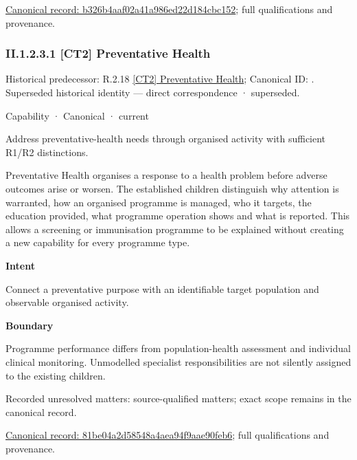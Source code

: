 {\footnotesize \href{../../../../continuum/strategy/capability/b326b4aaf02a41a986ed22d184cbc152.md}{Canonical record: b326b4aaf02a41a986ed22d184cbc152}; full qualifications and provenance.}\par
\subsubsection*{II.1.2.3.1 [CT2] Preventative Health}
\label{navigation:II.1.2.3.1}

{\small Historical predecessor: R.2.18 \hyperref[element:80affa7bcd284ecbbcbc5092f8497ddf]{[CT2] Preventative Health}; Canonical ID: \texttt{}. Superseded historical identity — direct correspondence · superseded.}\par
\label{element:81be04a2d58548a4aea94f9aae90feb6}
{\small Capability · Canonical · current}\par

Address preventative-health needs through organised activity with sufficient R1/R2 distinctions.



Preventative Health organises a response to a health problem before adverse outcomes arise or worsen. The established children distinguish why attention is warranted, how an organised programme is managed, who it targets, the education provided, what programme operation shows and what is reported. This allows a screening or immunisation programme to be explained without creating a new capability for every programme type.



\textbf{Intent}



Connect a preventative purpose with an identifiable target population and observable organised activity.



\textbf{Boundary}



Programme performance differs from population-health assessment and individual clinical monitoring. Unmodelled specialist responsibilities are not silently assigned to the existing children.


{\small Recorded unresolved matters: source-qualified matters; exact scope remains in the canonical record.}\par
{\footnotesize \href{../../../../continuum/strategy/capability/81be04a2d58548a4aea94f9aae90feb6.md}{Canonical record: 81be04a2d58548a4aea94f9aae90feb6}; full qualifications and provenance.}\par
